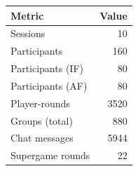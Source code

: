 \begin{tabular}{lr}
  \toprule
  Metric & Value \\ 
  \midrule
  Sessions & 10 \\ 
  Participants & 160 \\ 
  Participants (IF) & 80 \\ 
  Participants (AF) & 80 \\ 
  Player-rounds & 3520 \\ 
  Groups (total) & 880 \\ 
  Chat messages & 5944 \\ 
  Supergame rounds & 22 \\ 
  \bottomrule
\end{tabular}
